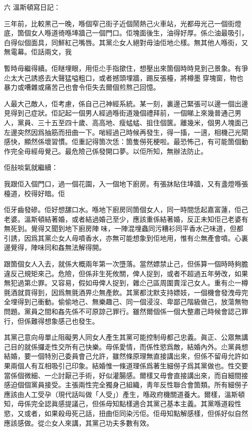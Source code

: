 六
溫斯頓寫日記：

	三年前，比較黑己一晚，喺個窄己街子近個鬧熱己火車站，光都毋光己一個街燈底，箇個女人喺道徛喺埲牆己一個門口。佢塊面後生，油得好厚。係尐油最吸引，白得似個面具，同鮮紅己嘴唇。其黨尐女人絕對毋油佢地尐樣。無其他人喺街，又無電幕。佢話兩文，我

暫時毋繼得續。佢瞇埋眼，用佢尐手指撳住，想壓出來箇個時時見到己景𧰼。有爭尐太大己誘惑去大聲猛嗌粗口，或者撼頭埋牆，踢反張檯，將樽墨𠌸穿塊窗，物也暴力或嘈雜或痛苦己也會令佢失去爾個煎熬己回憶。

人最大己敵人，佢考慮，係自己己神經系統。某一刻，裏邊己緊張可以邊一個出邊見得到己症狀。佢記起一個男人經過喺街道幾個禮拜前，一個睇上來幾普通己男人，黨員、三十五至四十歲、高高地、瘦蜢蜢、抯住個篋。離幾米，個男人塊面己左邊突然因爲抽筋而扭曲一下。啱經過己時候再發生，得一搐，一逳，相機己光閘感快，顯然係壞習慣。佢重記得箇次恁：箇隻僗死梗啦。最恐怖己，有可能箇個動作完全毋經毋覺己。最危險己係發開口夢。以佢所知，無辦法防止。

佢㪗啖氣就繼續：

	我跟佢入個門口，過一個花園，入一個地下廚房。有張牀貼住埲牆，又有盞燈喺張檯道，校得好暗。佢

佢牙齒發磣。佢好想𦧲口水。喺地下廚房同箇個女人，同一時間恁起嘉富蓮，佢己老婆。溫斯頓結著婚，或者結過婚己至少，應該重係結著婚，反正未知佢己老婆有無死到。覺得又聞到地下廚房陣𤈝味，一陣混埋蟲同污糟衫同平香水己味道，但都引誘，因爲其黨尐女人毋噴香水，亦無可能想𧰼到佢地用，惟有尐無產會噴。心裏邊覺得，陣味同和姦無法解得開。

跟箇個女人入去，就係大概兩年第一次墮落。當然嫖禁止己，但係算一個時時夠膽違反己規矩來己。危險，但係非生死攸關，俾人捉到，或者不超過五年勞改，如果無犯過第尐罪。又容易，假如毋俾人捉到，雜尐己區周圍賣淫己女人。重有尐一樽氈酒就買得到，因爲無氈酒畀尐無產飲。其黨都沈默支持嫖妓，一個機會發洩毋完全埋得到己衝動。偷偷地己、無樂趣己、同一個浸沒、卑鄙己階級做己，放蕩無物問題。黨員之間和姦先係不可原諒己罪行。雖然爾個係一個大整肅己時候會認己罪行，但係難得想𧰼感己也發生。

其黨己意向毋單止阻礙男人同女人產生其黨可能控制毋都己忠義。眞正、公眾無講己目的就係攞走性交所有己快樂。毋係愛情，而係性慾爲敵，結婚內外。尐黨員想結婚，要一個特別己委員會己允許，雖然條原理無直接講出來，但係不留毋允許如果兩個人有互相吸引己印𧰼。結婚惟一條道理係爲著生細僗子爲其黨做也。性交要當係個微細、一尐討厭己手術，好似灌腸感。爾樣又毋會直接講出來，而自細間接感迫個個黨員接受。主張兩性完全獨身己組織，靑年反性聯合會箇類。所有細僗子應該由人工受孕（現代話叫做「人受」）產生，喺政府機關道養大。爾樣，溫斯頓知，毋係完全認眞感提議己，但係毋知點樣適合其黨己基本主義。其黨喺道殺性慾，又或者，如果殺毋死己話，扭曲佢同染污佢。佢毋知點解感樣，但係好似自然應該感做。從尐女人來講，其黨己功夫多數有效。

